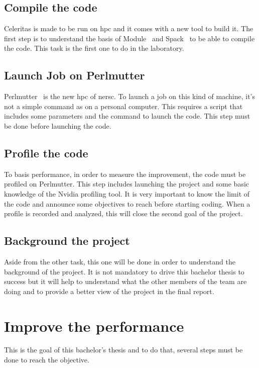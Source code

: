 \subsection{Compile the code}
\label{spec:ch:activities:understand-the-project:compile-the-code}
Celeritas is made to be run on \acrshort{hpc} and it comes with a new tool to build it.
The first step is to understand the basis of Module~\cite{Module} and Spack~\cite{Spack} to be able to compile the code.
This task is the first one to do in the laboratory.


\subsection{Launch Job on Perlmutter}
\label{spec:ch:activities:understand-the-project:launch-job-on-perlmutter}
Perlmutter~\cite{Perlmutter} is the new \acrshort{hpc} of \acrshort{nersc}.
To launch a job on this kind of machine, it's not a simple command as on a personal computer.
This requires a script that includes some parameters and the command to launch the code.
This step must be done before launching the code.


\subsection{Profile the code}
\label{specspec:ch:activities:understand-the-project:profile-the-code}
To basis performance, in order to measure the improvement, the code must be profiled on Perlmutter.
This step includes launching the project and some basic knowledge of the Nvidia profiling tool.
It is very important to know the limit of the code and announce some objectives to reach before starting coding.
When a profile is recorded and analyzed, this will close the second goal of the project.


\subsection{Background the project}
\label{spec:ch:activities:understand-the-project:background-the-project}
Aside from the other task, this one will be done in order to understand the background of the project.
It is not mandatory to drive this bachelor thesis to success but it will help to understand what the other members of the team are doing and to provide a better view of the project in the final report.



\section{Improve the performance}
\label{spec:ch:activities:improve-the-performance}
This is the goal of this bachelor's thesis and to do that, several steps must be done to reach the objective.



